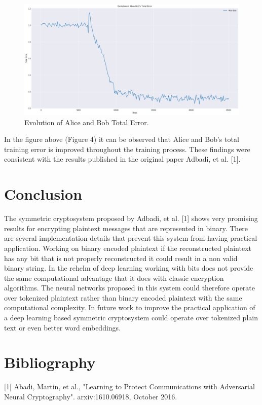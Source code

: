 \documentclass[12pt]{article}
\begin{document}
\begin{figure}[h]
\includegraphics[width=16cm]{../assets/AliceBobTotalError.png}
\caption{Evolution of Alice and Bob Total Error.}
\centering
\end{figure}

In the figure above (Figure 4) it can be observed that Alice and Bob's total training error is improved throughout the training process. These findings were consistent with the results published in the original paper Adbadi, et al. [1].

\section{Conclusion}
The symmetric cryptosystem proposed by Adbadi, et al. [1] shows very promising results for encrypting plaintext messages that are represented in binary. There are several implementation details that prevent this system from having practical application. Working on binary encoded plaintext if the reconstructed plaintext has any bit that is not properly reconstructed it could result in a non valid binary string. In the rehelm of deep learning working with bits does not provide the same computational advantage that it does with classic encryption algorithms. The neural networks proposed in this system could therefore operate over tokenized plaintext rather than binary encoded plaintext with the same computational complexity. In future work to improve the practical application of a deep learning based symmetric cryptosystem could operate over tokenized plain text or even better word embeddings.

\section{Bibliography}

[1] Abadi, Martin, et al., "Learning to Protect Communications
with Adversarial Neural Cryptography". arxiv:1610.06918, October 2016.
\newline
\end{document}

